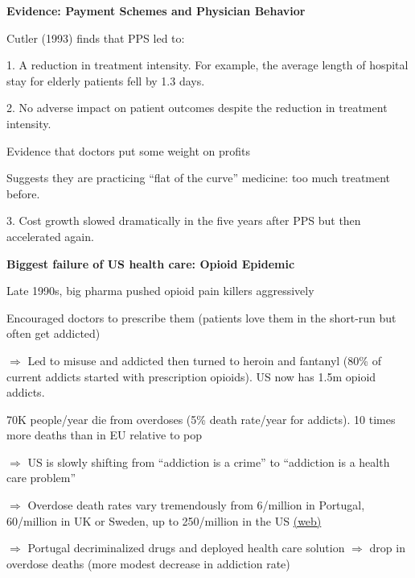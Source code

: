 \documentclass[landscape]{slides}
\begin{document}
\begin{slide}
\begin{center}
{\bf Evidence: Payment Schemes and Physician Behavior}
\end{center}
Cutler (1993) finds that PPS led to:

1. A reduction in treatment intensity. For example, the average length of hospital stay for elderly patients fell by 1.3 days.

2. No adverse impact on patient outcomes despite the reduction in treatment intensity.

Evidence that doctors put some weight on profits

Suggests they are practicing ``flat of the curve'' medicine: too much treatment before.

3. Cost growth slowed dramatically in the five years after PPS but then accelerated again.\end{slide}


%
%
%


\begin{slide}
\begin{center}
{\bf Biggest failure of US health care: Opioid Epidemic}
\end{center}

Late 1990s, big pharma pushed opioid pain killers aggressively 

Encouraged doctors to prescribe them (patients love them in the short-run
but often get addicted)

$\Rightarrow$ Led to misuse and addicted then turned to heroin and
fantanyl (80\% of current addicts started with prescription opioids). US now has 
1.5m opioid addicts.

70K people/year die from overdoses (5\% death rate/year for addicts).
10 times more deaths than in EU relative to pop

$\Rightarrow$ US is slowly shifting from ``addiction is a crime'' to ``addiction is a health 
care problem''

\small 
$\Rightarrow$ Overdose death rates vary tremendously from 6/million in Portugal, 60/million in UK or Sweden, up to 250/million in the US \href{http://www.emcdda.europa.eu/countries/} {(web)}

$\Rightarrow$  Portugal decriminalized drugs and deployed health care solution $\Rightarrow$ drop in overdose deaths (more modest decrease in addiction rate)

\end{slide}
\end{document}
